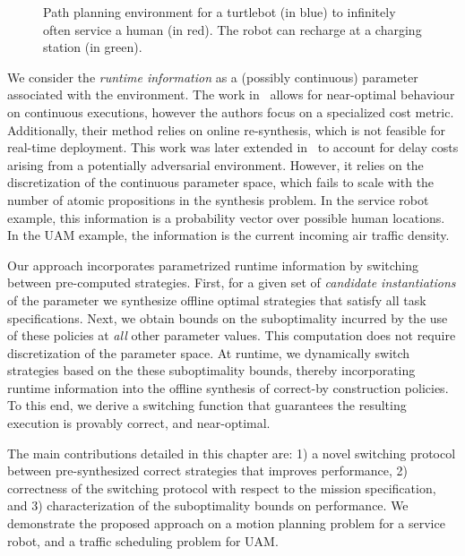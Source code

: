 \begin{figure}
     \centering
    
    \caption{Path planning environment for a turtlebot (in blue) to infinitely often service a human (in red). The robot can recharge at a charging station (in green).}
    \label{fig:gazeboworld}
\end{figure}



We consider the \emph{runtime information} as a (possibly continuous) parameter associated with the environment. The work in~\cite{jangcontinuous} allows for near-optimal behaviour on continuous executions, however the authors focus on a specialized cost metric. Additionally, their method relies on online re-synthesis, which is not feasible for real-time deployment. This work was later extended in~\cite{Ehlerscost} to account for delay costs arising from a potentially adversarial environment. However, it relies on the discretization of the continuous parameter space, which fails to scale with the number of atomic propositions in the synthesis problem. 
In the service robot example, this information is a probability vector over possible human locations. In the UAM example, the information is the current incoming air traffic density. 

Our approach incorporates parametrized runtime information by switching between pre-computed strategies. First, for a given set of \emph{candidate instantiations} of the parameter we synthesize offline optimal strategies that satisfy all task specifications. Next, we obtain bounds on the suboptimality incurred by the use of these policies at \emph{all} other parameter values. This computation does not require discretization of the parameter space. At runtime, we dynamically switch strategies based on the these suboptimality bounds, thereby incorporating runtime information into the offline synthesis of correct-by construction policies. 
To this end, we derive a switching function that guarantees the resulting execution is provably correct, and near-optimal.

The main contributions detailed in this chapter are: 1) a novel switching protocol between pre-synthesized correct strategies that improves performance, 2) correctness of the switching protocol with respect to the mission specification, and 3) characterization of the suboptimality bounds on performance. We demonstrate the proposed approach on a motion planning problem for a service robot, and a traffic scheduling problem for UAM. 

